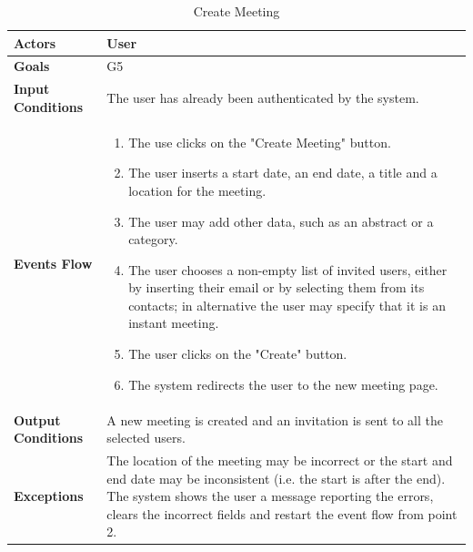 \begin{table}[H]
	\centering
	\def\arraystretch{1.5}
	\begin{tabular}{|p{7cm}|p{7cm}|}
		\hline
		\textbf{Actors}            & User		    \\ \hline
		\textbf{Goals}             & G5           \\ \hline
		\textbf{Input Conditions}  & The user has already been authenticated by the system.           \\ \hline
		\textbf{Events Flow}       & 
			\begin{enumerate}[topsep=0pt, leftmargin=*]
				\item The use clicks on the "Create Meeting" button.
				\item The user inserts a start date, an end date, a title and a location for the meeting.
				\item The user may add other data, such as an abstract or a category.
				\item The user chooses a non-empty list of invited users, either by inserting their email or by selecting them from its contacts; in alternative the user may specify that it is an instant meeting.
				\item The user clicks on the "Create" button.
				\item The system redirects the user to the new meeting page.
			\end{enumerate}               \\ \hline
		\textbf{Output Conditions} & A new meeting is created and an invitation is sent to all the selected users.           \\ \hline
		\textbf{Exceptions}        & The location of the meeting may be incorrect or the start and end date may be inconsistent (i.e. the start is after the end). The system shows the user a message reporting the errors, clears the incorrect fields and restart the event flow from point 2.          \\ \hline
	\end{tabular}
	\caption{Create Meeting}
\end{table}

